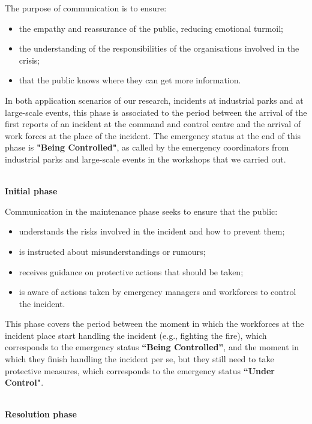 The purpose of communication is to ensure:

\begin{itemize}
   \item the empathy and reassurance of the public, reducing emotional turmoil;
   \item the understanding of the responsibilities of the organisations involved in the crisis;
   \item that the public knows where they can get more information.
 \end{itemize}
 
 In both application scenarios of our research, incidents at industrial parks and at large-scale events, this phase is associated to the period between the arrival of the first reports of an incident at the command and control centre and the arrival of work forces at the place of the incident. The emergency status at the end of this phase is \textbf{"Being Controlled"}, as called by the emergency coordinators from industrial parks and large-scale events in the workshops that we carried out.
 
\textbf{\\Initial phase\\}
 
 Communication in the maintenance phase seeks to ensure that the public:
 
 \begin{itemize}
   \item understands the risks involved in the incident and how to prevent them;
   \item is instructed about misunderstandings or rumours;
   \item receives guidance on protective actions that should be taken;
   \item is aware of actions taken by emergency managers and workforces to control the incident.
   
 \end{itemize}
 
 
 This phase covers the period between the moment in which the workforces at the incident place start handling the incident (e.g., fighting the fire), which corresponds to the emergency status \textbf{“Being Controlled”}, and the moment in which they finish handling the incident per se, but they still need to take protective measures, which corresponds to the emergency status \textbf{“Under Control"}.
 
  \textbf{\\Resolution phase\\}
  

